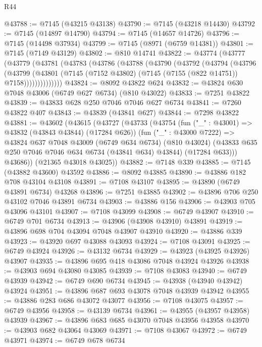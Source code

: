\begin{lexlean}{R44}
\begin{coremodule}
{@43788 := @7145 (@43215 @43138)
@43790 := @7145 (@43218 @14430)
@43792 := @7145 (@14897 @14790)
@43794 := @7145 (@14657 @14726)
@43796 := @7145 (@14498 @37934)
@43799 := @7145 (@8971 (@6759 @14381))
@43801 := @7145 (@7149 @43129)
@43802 := @810 @14741
@43822 := @43774
    (@43777
      (@43779
        (@43781
          (@43783
            (@43786
              (@43788
                (@43790
                  (@43792
                    (@43794
                      (@43796
                        (@43799
                          (@43801
                            (@7145 (@7152 @43802) (@7145 (@7155 (@822 @14751)) @7158))))))))))))))
@43824 := @8092 @43822 @624
@43832 := @43824 @630 @7048 @43006 (@6749 @627 @6734) (@810 @43022)
@43833 := @7251 @43822
@43839 := @43833 @628 @250 @7046 @7046 @627 @6734
@43841 := @7260 @43822 @407
@43843 := @43839 (@43841 @627)
@43844 := @7298 @43822
@43881 := @43602
    (@43615
      (@43727
        (@43733
          (@43754
            (fun ("_" : @43001) => @43832 (@43843 @43844) (@17284 @626))
            (fun ("_" : @43000 @7222) =>
            @43824
              @637
              @7048
              @43009
              (@6749 @634 @6734)
              (@810 @43024)
              (@43833 @635 @250 @7046 @7046 @634 @6734 (@43841 @634) @43844)
              (@17284 @633)))
          @43686))
      (@21365 @43018 @43025))
@43882 := @7148 @339
@43885 := @7145 (@43882 @43600) @43592
@43886 := @8092 @43885
@43890 := @43886 @182 @708 @43104 @43108
@43891 := @7108 @43107
@43895 := @43890 (@6749 @43891 @6734) @43268
@43896 := @7251 @43885
@43902 := @43896 @706 @250 @43102 @7046 @43891 @6734
@43903 := @43886 @156
@43906 := @43903 @705 @43096 @43101
@43907 := @7108 @43099
@43908 := @6749 @43907
@43910 := @6749 @701 @6734
@43913 := @43906 (@43908 @43910) @43891
@43919 := @43896 @698 @704 @43094 @7048 @43907 @43910
@43920 := @43886 @339
@43923 := @43920 @697 @43088 @43093
@43924 := @7108 @43091
@43925 := @6749 @43924
@43926 := @43132 @6734
@43929 := @43923 (@43925 @43926) @43907
@43935 := @43896 @695 @418 @43086 @7048 @43924 @43926
@43938 := @43903 @694 @43080 @43085
@43939 := @7108 @43083
@43940 := @6749 @43939
@43942 := @6749 @690 @6734
@43945 := @43938 (@43940 @43942) @43924
@43951 := @43896 @687 @693 @43078 @7048 @43939 @43942
@43955 := @43886 @283 @686 @43072 @43077
@43956 := @7108 @43075
@43957 := @6749 @43956
@43958 := @43139 @6734
@43961 := @43955 (@43957 @43958) @43939
@43967 := @43896 @683 @685 @43070 @7048 @43956 @43958
@43970 := @43903 @682 @43064 @43069
@43971 := @7108 @43067
@43972 := @6749 @43971
@43974 := @6749 @678 @6734
}
\end{coremodule}
\end{lexlean}
